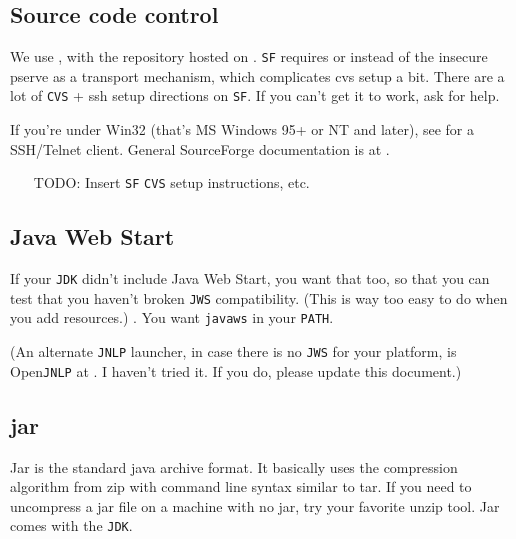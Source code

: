 \documentclass{article}
\begin{document}
\subsection{Source code control}

We use , with the repository 
hosted on .
\texttt{SF} requires  or
 instead of the insecure pserve
as a transport mechanism, which complicates cvs setup a bit. There are a
lot of \texttt{CVS} + ssh setup directions on \texttt{SF}. If you can't
get it to work, ask for help.

If you're under Win32 (that's MS Windows 95+ or NT and later), see
 for a SSH/Telnet client. General SourceForge
documentation is at .

\begin{itemize}
\item[TODO:] Insert \texttt{SF} \texttt{CVS} setup instructions, etc.
\end{itemize}

\subsection{Java Web Start}

If your \texttt{JDK} didn't include Java Web Start, you want that too, so 
that you can test that you haven't broken \texttt{JWS} compatibility. (This
is way too easy to do when you add resources.)
. You want \texttt{javaws} in your
\texttt{PATH}.

(An alternate \texttt{JNLP} launcher, in case there is no \texttt{JWS} for
your platform, is Open\texttt{JNLP} at
.
I haven't tried it. If you do, please update this document.)

\subsection{jar}

Jar is the standard java archive format. It basically uses the compression 
algorithm from zip with command line syntax similar to tar. If you need to 
uncompress a jar file on a machine with no jar, try your favorite unzip tool. 
Jar comes with the \texttt{JDK}.
\end{document}
